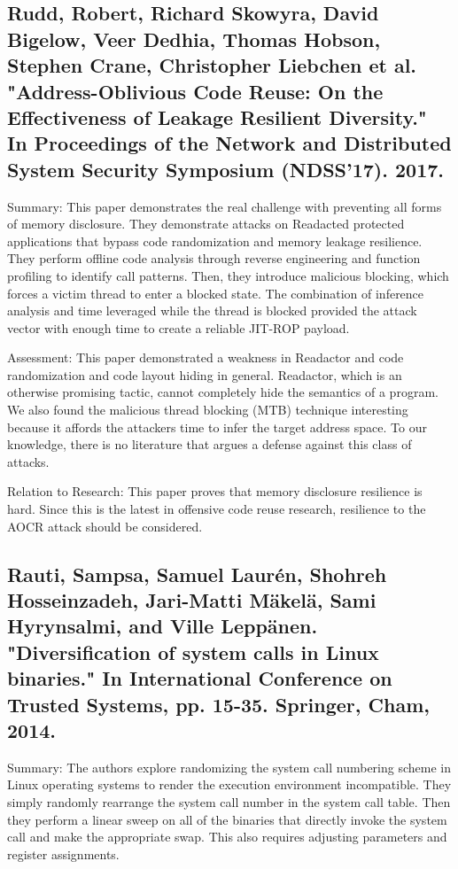 \documentclass[preprint,12pt]{elsarticle}
\begin{document}
\subsection{
\cite{rudd2017address} Rudd, Robert, Richard Skowyra, David Bigelow, Veer Dedhia, Thomas Hobson, Stephen Crane, Christopher Liebchen et al. "Address-Oblivious Code Reuse: On the Effectiveness of Leakage Resilient Diversity." In Proceedings of the Network and Distributed System Security Symposium (NDSS’17). 2017.
}

Summary: This paper demonstrates the real challenge with preventing all forms of memory disclosure. They demonstrate attacks on Readacted protected applications that bypass code randomization and memory leakage resilience. They perform offline code analysis through reverse engineering and function profiling to identify call patterns. Then, they introduce malicious blocking, which forces a victim thread to enter a blocked state. The combination of inference analysis and time leveraged while the thread is blocked provided the attack vector with enough time to create a reliable JIT-ROP payload.

Assessment: This paper demonstrated a weakness in Readactor and code randomization and code layout hiding in general. Readactor, which is an otherwise promising tactic, cannot completely hide the semantics of a program. We also found the malicious thread blocking (MTB) technique interesting because it affords the attackers time to infer the target address space. To our knowledge, there is no literature that argues a defense against this class of attacks.

Relation to Research: This paper proves that memory disclosure resilience is hard. Since this is the latest in offensive code reuse research, resilience to the AOCR attack should be considered. 

\subsection{
\cite{Rauti14} Rauti, Sampsa, Samuel Laurén, Shohreh Hosseinzadeh, Jari-Matti Mäkelä, Sami Hyrynsalmi, and Ville Leppänen. "Diversification of system calls in Linux binaries." In International Conference on Trusted Systems, pp. 15-35. Springer, Cham, 2014.
}

Summary: The authors explore randomizing the system call numbering scheme in Linux operating systems to render the execution environment incompatible. They simply randomly rearrange the system call number in the system call table. Then they perform a linear sweep on all of the binaries that directly invoke the system call and make the appropriate swap. This also requires adjusting parameters and register assignments.
\end{document}
